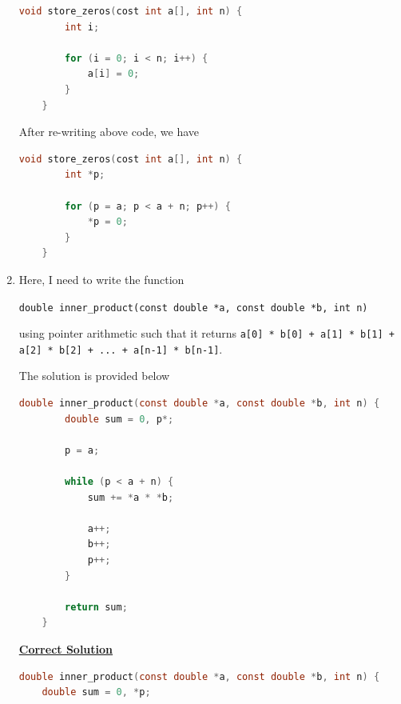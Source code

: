 \documentclass[12pt]{article}
\begin{document}
\begin{enumerate}[1.]
    \bigskip

\begin{lstlisting}[language=c]
    void store_zeros(cost int a[], int n) {
        int i;

        for (i = 0; i < n; i++) {
            a[i] = 0;
        }
    }
\end{lstlisting}

    \bigskip

    After re-writing above code, we have

\begin{lstlisting}[language=c]
    void store_zeros(cost int a[], int n) {
        int *p;

        for (p = a; p < a + n; p++) {
            *p = 0;
        }
    }
\end{lstlisting}

    \item

    Here, I need to write the function

    \bigskip

    \texttt{double inner\_product(const double *a, const double *b, int n)}

    \bigskip

    using pointer arithmetic such that it returns \texttt{a[0] * b[0] + a[1] *
    b[1] + a[2] * b[2] + ... + a[n-1] * b[n-1]}.

    \bigskip

    The solution is provided below

    \bigskip

\begin{lstlisting}[language=c]
    double inner_product(const double *a, const double *b, int n) {
        double sum = 0, p*;

        p = a;

        while (p < a + n) {
            sum += *a * *b;

            a++;
            b++;
            p++;
        }

        return sum;
    }
\end{lstlisting}

    \bigskip

    \begin{mdframed}
        \underline{\textbf{Correct Solution}}

        \bigskip

\begin{lstlisting}[language=c]
double inner_product(const double *a, const double *b, int n) {
    double sum = 0, *p;


\end{lstlisting}
\end{mdframed}
\end{enumerate}
\end{document}
